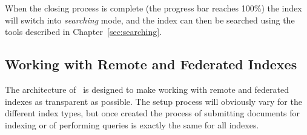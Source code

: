 When the closing process is complete (the progress bar reaches 100\%) the index
will switch into {\em searching} mode, and the index can then be searched using
the tools described in Chapter~\ref{sec:searching}.

\subsection{Working with Remote and Federated Indexes}

The architecture of \Mimir\ is designed to make working with remote and
federated indexes as transparent as possible.  The setup process will obviously
vary for the different index types, but once created the process of submitting
documents for indexing or of performing queries is exactly the same for all
indexes.

